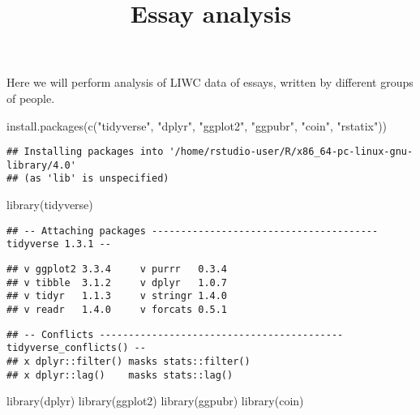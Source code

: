 \documentclass[
]{article}
\title{Essay analysis}
\author{}
\date{\vspace{-2.5em}}
\newenvironment{Shaded}{\begin{snugshade}}{\end{snugshade}}
\newcommand{\FunctionTok}[1]{\textcolor[rgb]{0.00,0.00,0.00}{#1}}
\newcommand{\NormalTok}[1]{#1}
\newcommand{\StringTok}[1]{\textcolor[rgb]{0.31,0.60,0.02}{#1}}
\begin{document}
\maketitle

Here we will perform analysis of LIWC data of essays, written by
different groups of people.

\begin{Shaded}
\begin{Highlighting}[]
\FunctionTok{install.packages}\NormalTok{(}\FunctionTok{c}\NormalTok{(}\StringTok{"tidyverse"}\NormalTok{, }\StringTok{"dplyr"}\NormalTok{, }\StringTok{"ggplot2"}\NormalTok{, }\StringTok{"ggpubr"}\NormalTok{, }\StringTok{"coin"}\NormalTok{, }\StringTok{"rstatix"}\NormalTok{))}
\end{Highlighting}
\end{Shaded}

\begin{verbatim}
## Installing packages into '/home/rstudio-user/R/x86_64-pc-linux-gnu-library/4.0'
## (as 'lib' is unspecified)
\end{verbatim}

\begin{Shaded}
\begin{Highlighting}[]
\FunctionTok{library}\NormalTok{(tidyverse)}
\end{Highlighting}
\end{Shaded}

\begin{verbatim}
## -- Attaching packages --------------------------------------- tidyverse 1.3.1 --
\end{verbatim}

\begin{verbatim}
## v ggplot2 3.3.4     v purrr   0.3.4
## v tibble  3.1.2     v dplyr   1.0.7
## v tidyr   1.1.3     v stringr 1.4.0
## v readr   1.4.0     v forcats 0.5.1
\end{verbatim}

\begin{verbatim}
## -- Conflicts ------------------------------------------ tidyverse_conflicts() --
## x dplyr::filter() masks stats::filter()
## x dplyr::lag()    masks stats::lag()
\end{verbatim}

\begin{Shaded}
\begin{Highlighting}[]
\FunctionTok{library}\NormalTok{(dplyr)}
\FunctionTok{library}\NormalTok{(ggplot2)}
\FunctionTok{library}\NormalTok{(ggpubr)}
\FunctionTok{library}\NormalTok{(coin)}
\end{Highlighting}
\end{Shaded}
\end{document}
